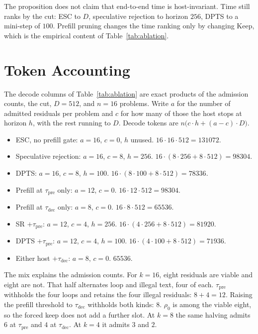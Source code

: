 The proposition does not claim that end-to-end time is host-invariant.
Time still ranks by the cut: ESC to $D$, speculative rejection to horizon $256$, DPTS to a mini-step of $100$.
Prefill pruning changes the time ranking only by changing $\mathrm{Keep}$, which is the empirical content of Table~\ref{tab:ablation}.

\section{Token Accounting}
\label{app:account}

The decode columns of Table~\ref{tab:ablation} are exact products of the admission counts, the cut, $D{=}512$, and $n{=}16$ problems.
Write $a$ for the number of admitted residuals per problem and $c$ for how many of those the host stops at horizon $h$, with the rest running to $D$.
Decode tokens are $n \bigl(c \cdot h + (a-c) \cdot D\bigr)$.

\begin{itemize}
  \item ESC, no prefill gate: $a{=}16$, $c{=}0$, $h$ unused. $16 \cdot 16 \cdot 512 = 131072$.
  \item Speculative rejection: $a{=}16$, $c{=}8$, $h{=}256$. $16 \cdot (8\cdot 256 + 8\cdot 512) = 98304$.
  \item DPTS: $a{=}16$, $c{=}8$, $h{=}100$. $16 \cdot (8\cdot 100 + 8\cdot 512) = 78336$.
  \item Prefill at $\tau_{\mathrm{pre}}$ only: $a{=}12$, $c{=}0$. $16 \cdot 12 \cdot 512 = 98304$.
  \item Prefill at $\tau_{\mathrm{dec}}$ only: $a{=}8$, $c{=}0$. $16 \cdot 8 \cdot 512 = 65536$.
  \item SR $+\tau_{\mathrm{pre}}$: $a{=}12$, $c{=}4$, $h{=}256$. $16 \cdot (4\cdot 256 + 8\cdot 512) = 81920$.
  \item DPTS $+\tau_{\mathrm{pre}}$: $a{=}12$, $c{=}4$, $h{=}100$. $16 \cdot (4\cdot 100 + 8\cdot 512) = 71936$.
  \item Either host $+\tau_{\mathrm{dec}}$: $a{=}8$, $c{=}0$. $65536$.
\end{itemize}

The mix explains the admission counts.
For $k{=}16$, eight residuals are viable and eight are not.
That half alternates loop and illegal text, four of each.
$\tau_{\mathrm{pre}}$ withholds the four loops and retains the four illegal residuals: $8+4=12$.
Raising the prefill threshold to $\tau_{\mathrm{dec}}$ withholds both kinds: $8$.
$\rho_0$ is among the viable eight, so the forced keep does not add a further slot.
At $k{=}8$ the same halving admits $6$ at $\tau_{\mathrm{pre}}$ and $4$ at $\tau_{\mathrm{dec}}$.
At $k{=}4$ it admits $3$ and $2$.

